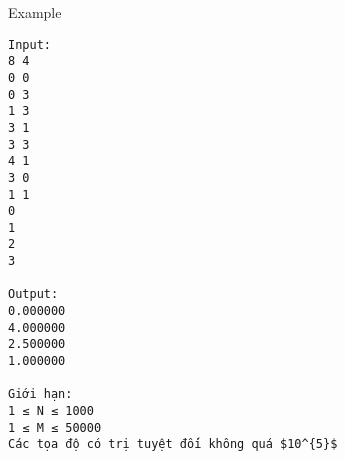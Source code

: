 Example
\begin{verbatim}
Input:
8 4
0 0
0 3
1 3
3 1
3 3
4 1
3 0
1 1
0
1
2
3

Output:
0.000000
4.000000
2.500000
1.000000

Giới hạn:
1 ≤ N ≤ 1000 
1 ≤ M ≤ 50000
Các tọa độ có trị tuyệt đối không quá $10^{5}$\end{verbatim}